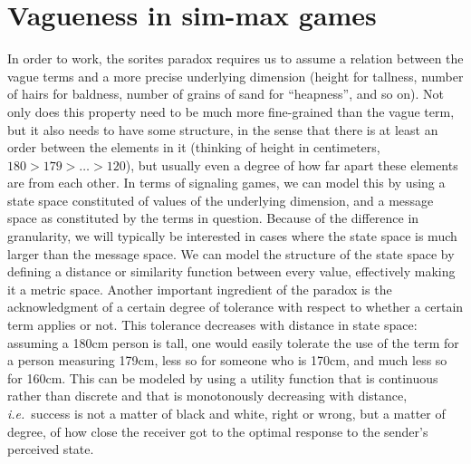 \documentclass[a4paper]{article}
\begin{document}
\section{Vagueness in sim-max games}
\label{sec:sim-max-vagueness}

In order to work, the sorites paradox requires us to assume a relation between the vague terms and a more precise underlying dimension (height for tallness, number of hairs for baldness, number of grains of sand for ``heapness'', and so on).
Not only does this property need to be much more fine-grained than the vague term, but it also needs to have some structure, in the sense that there is at least an order between the elements in it (thinking of height in centimeters, $180 > 179 > \ldots > 120$), but usually even a degree of how far apart these elements are from each other.
In terms of signaling games, we can model this by using a state space constituted of values of the underlying dimension, and a message space as constituted by the terms in question.
Because of the difference in granularity, we will typically be interested in cases where the state space is much larger than the message space.
We can model the structure of the state space by defining a distance or similarity function between every value, effectively making it a metric space.
Another important ingredient of the paradox is the acknowledgment of a certain degree of tolerance with respect to whether a certain term applies or not.
This tolerance decreases with distance in state space: assuming a 180cm person is tall, one would easily tolerate the use of the term for a person measuring 179cm, less so for someone who is 170cm, and much less so for 160cm.
This can be modeled by using a utility function that is continuous rather than discrete and that is monotonously decreasing with distance, \emph{i.e.}~success is not a matter of black and white, right or wrong, but a matter of degree, of how close the receiver got to the optimal response to the sender's perceived state.
\end{document}
